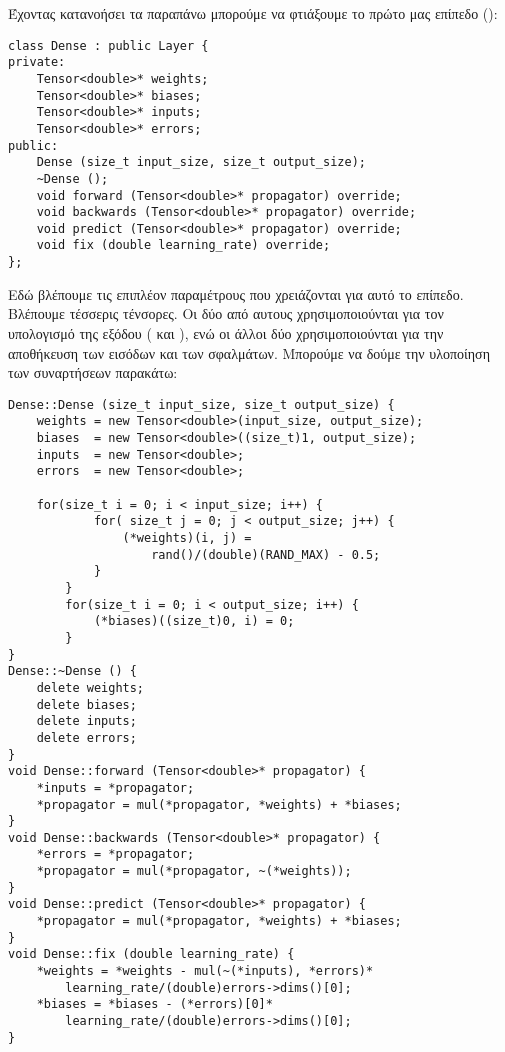 Έχοντας κατανοήσει τα παραπάνω μπορούμε να φτιάξουμε το πρώτο μας επίπεδο ():
\begin{otherlanguage}{english}
\begin{lstlisting}[style=cppstyle,caption= Dense layer in hpp file]
class Dense : public Layer {
private:
    Tensor<double>* weights;
    Tensor<double>* biases;
    Tensor<double>* inputs;
    Tensor<double>* errors;
public:
    Dense (size_t input_size, size_t output_size);
    ~Dense ();
    void forward (Tensor<double>* propagator) override;
    void backwards (Tensor<double>* propagator) override;
    void predict (Tensor<double>* propagator) override;
    void fix (double learning_rate) override;
};
\end{lstlisting}
\end{otherlanguage}
Εδώ βλέπουμε τις επιπλέον παραμέτρους που χρειάζονται για αυτό το επίπεδο. Βλέπουμε τέσσερις τένσορες. Οι δύο από αυτους χρησιμοποιούνται για τον υπολογισμό της εξόδου ( και ), ενώ οι άλλοι δύο χρησιμοποιούνται για
την αποθήκευση των εισόδων και των σφαλμάτων. Μπορούμε να δούμε την υλοποίηση των συναρτήσεων παρακάτω:
\begin{otherlanguage}{english}
\begin{lstlisting}[style=cppstyle,caption= Dense layer in cpp file, xleftmargin=-0.1cm, xrightmargin=-0.1cm]
Dense::Dense (size_t input_size, size_t output_size) {
    weights = new Tensor<double>(input_size, output_size);
    biases  = new Tensor<double>((size_t)1, output_size);
    inputs  = new Tensor<double>;
    errors  = new Tensor<double>;

    for(size_t i = 0; i < input_size; i++) {
            for( size_t j = 0; j < output_size; j++) {
                (*weights)(i, j) =
                    rand()/(double)(RAND_MAX) - 0.5;
            }
        }
        for(size_t i = 0; i < output_size; i++) {
            (*biases)((size_t)0, i) = 0;
        }
}
Dense::~Dense () {
    delete weights;
    delete biases;
    delete inputs;
    delete errors;
}
void Dense::forward (Tensor<double>* propagator) {
    *inputs = *propagator;
    *propagator = mul(*propagator, *weights) + *biases;
}
void Dense::backwards (Tensor<double>* propagator) {
    *errors = *propagator;
    *propagator = mul(*propagator, ~(*weights));
}
void Dense::predict (Tensor<double>* propagator) {
    *propagator = mul(*propagator, *weights) + *biases;
}
void Dense::fix (double learning_rate) {
    *weights = *weights - mul(~(*inputs), *errors)*
        learning_rate/(double)errors->dims()[0];
    *biases = *biases - (*errors)[0]*
        learning_rate/(double)errors->dims()[0];
}
\end{lstlisting}
\end{otherlanguage}
